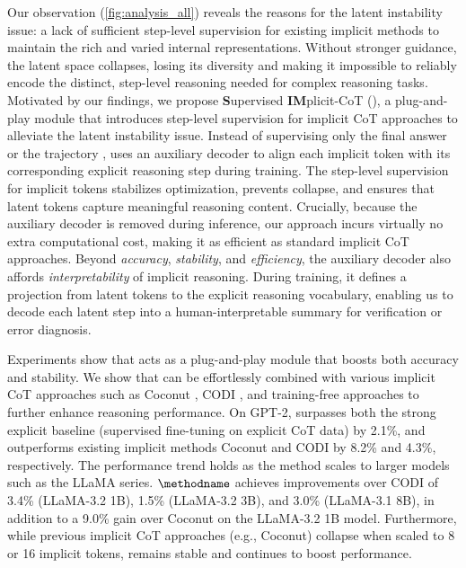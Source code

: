 

Our observation (\cref{fig:analysis_all}) reveals the reasons for the latent instability issue: a lack of sufficient step-level supervision for existing implicit methods to maintain the rich and varied internal representations.
Without stronger guidance, the latent space collapses, losing its diversity and making it impossible to reliably encode the distinct, step-level reasoning needed for complex reasoning tasks.
Motivated by our findings, we propose \textbf{S}upervised \textbf{IM}plicit-CoT (\textbf{\methodname}), a plug-and-play module that introduces step-level supervision for implicit CoT approaches to alleviate the latent instability issue.
Instead of supervising only the final answer \citep{hao2024coconut} or the trajectory \citep{shen2025codi}, \methodname uses an auxiliary decoder to align each implicit token with its corresponding explicit reasoning step during training.
The step-level supervision for implicit tokens stabilizes optimization, prevents collapse, and ensures that latent tokens capture meaningful reasoning content.
Crucially, because the auxiliary decoder is removed during inference, our approach incurs virtually no extra computational cost, making it as efficient as standard implicit CoT approaches.
Beyond \textit{accuracy}, \textit{stability}, and \textit{efficiency}, the auxiliary decoder also affords \textit{interpretability} of implicit reasoning.
During training, it defines a projection from latent tokens to the explicit reasoning vocabulary, enabling us to decode each latent step into a human-interpretable summary for verification or error diagnosis.

Experiments show that \methodname acts as a plug-and-play module that boosts both accuracy and stability.
We show that \methodname can be effortlessly combined with various implicit CoT approaches such as Coconut \citep{hao2024coconut}, CODI \citep{shen2025codi}, and training-free approaches \citep{zhang2025soft} to further enhance reasoning performance.
On GPT-2, \methodname surpasses both the strong explicit baseline (supervised fine-tuning on explicit CoT data) by 2.1\%, and outperforms existing implicit methods Coconut and CODI by 8.2\% and 4.3\%, respectively.
The performance trend holds as the method scales to larger models such as the LLaMA series. $\text{\methodname}$ achieves improvements over CODI of 3.4\% (LLaMA-3.2 1B), 1.5\% (LLaMA-3.2 3B), and 3.0\% (LLaMA-3.1 8B), in addition to a 9.0\% gain over Coconut on the LLaMA-3.2 1B model.
Furthermore, while previous implicit CoT approaches (e.g., Coconut) collapse when scaled to 8 or 16 implicit tokens, \methodname remains stable and continues to boost performance.

